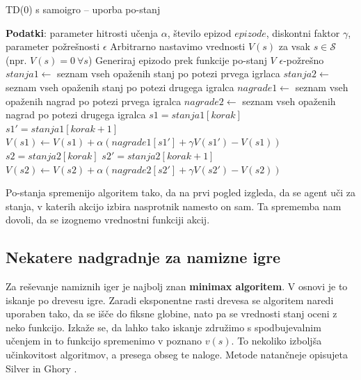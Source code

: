 \documentclass[12pt,a4paper]{amsart}
\theoremstyle{definition} %
\theoremstyle{plain} %
\begin{document}
\begin{algorithm}[H]
    \caption{TD($0$) s samoigro -- uporba po-stanj}
\begin{algorithmic}
    \STATE \textbf{Podatki}: parameter hitrosti učenja $\alpha$, število epizod $epizode$, diskontni 
            faktor $\gamma$, parameter požrešnosti $\epsilon$
    \STATE 
    \STATE Arbitrarno nastavimo vrednosti $V(s)$ za vsak $s \in \mathcal{S}$ (npr. $V(s) = 0~\forall s$)
    \STATE
        \STATE Generiraj epizodo prek funkcije po-stanj $V$ $\epsilon$-požrešno
        \STATE $stanja1 \leftarrow$ seznam vseh opaženih stanj po potezi prvega igrlaca
        \STATE $stanja2 \leftarrow$ seznam vseh opaženih stanj po potezi drugega igralca
        \STATE $nagrade1 \leftarrow$ seznam vseh opaženih nagrad po potezi prvega igralca
        \STATE $nagrade2 \leftarrow$ seznam vseh opaženih nagrad po potezi drugega igralca
        \STATE
                \STATE $s1 = stanja1[korak]$
                \STATE $s1' = stanja1[korak + 1]$
                \STATE $V(s1) \leftarrow V(s1) + \alpha (nagrade1[s1'] + \gamma V(s1') - V(s1))$ 
            \ELSE
                \STATE $s2 = stanja2[korak]$
                \STATE $s2' = stanja2[korak + 1]$
                \STATE $V(s2) \leftarrow V(s2) + \alpha (nagrade2[s2'] + \gamma V(s2') - V(s2))$ 
            \ENDIF
        \ENDFOR
    \ENDFOR
\end{algorithmic}
\end{algorithm}

Po-stanja spremenijo algoritem tako, da na prvi pogled izgleda, da se agent uči za stanja, v katerih 
akcijo izbira nasprotnik namesto on sam. Ta sprememba nam dovoli, da se izognemo vrednostni funkciji 
akcij.

\subsection{Nekatere nadgradnje za namizne igre}
Za reševanje namiznih iger je najbolj znan \textbf{minimax algoritem}. V osnovi je to iskanje po drevesu 
igre. Zaradi eksponentne rasti drevesa se algoritem naredi uporaben tako, da se išče do fiksne globine, 
nato pa se vrednosti stanj oceni z neko funkcijo. Izkaže se, da lahko tako iskanje združimo s 
spodbujevalnim učenjem in to funkcijo spremenimo v poznano $v(s)$. To nekoliko izboljša učinkovitost 
algoritmov, a presega obseg te naloge. Metode natančneje opisujeta Silver \cite{LecNotesSilver} in 
Ghory \cite{RLboard}.
\end{document}
